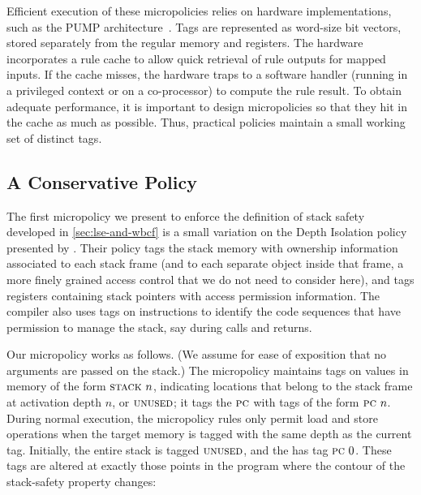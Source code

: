 \documentclass[acmsmall,review,anonymous]{acmart}\settopmatter{printfolios=true,printccs=false,printacmref=false}
\begin{document}
{Efficient execution of these micropolicies relies on hardware implementations,
such as the PUMP architecture~\citep{pump:asplos2015}.  Tags are represented
as word-size bit vectors, stored separately from the regular memory and registers.
The hardware incorporates a rule cache
to allow quick retrieval of rule outputs for mapped inputs. If the cache misses,
the hardware traps to a software handler (running in a privileged context or
on a co-processor) to compute the rule result. To obtain adequate performance,
it is important to design micropolicies so that they hit in the cache as
much as possible. Thus, practical policies maintain a small working set of
distinct tags.

\subsection{A Conservative Policy}
\label{sec:conservative}
%
The first micropolicy we present to enforce the definition of stack
safety developed in \cref{sec:lse-and-wbcf} is a small variation
on the Depth Isolation policy presented by
\citet{DBLP:conf/sp/RoesslerD18}. Their policy tags the stack memory
with ownership information associated to each stack frame (and to each
separate object inside that frame, a more finely grained access
control that we do not need to consider here), and tags registers containing
stack pointers with access permission information. The compiler also
uses tags on instructions to identify the code
sequences that have permission to manage the stack, say during calls and returns.

Our micropolicy works as follows. (We assume for ease of exposition that no
arguments are passed on the stack.)
The micropolicy maintains tags on values in memory of the form $\textsc{stack} ~ n$,
indicating locations that belong to the stack frame at activation depth $n$,
or $\textsc{unused}$; it tags the $\textsc{pc}$ with tags of the form $\textsc{pc} ~ n$.
During normal execution, the micropolicy rules only permit load and store operations
when the target memory is tagged with the same depth as the current {\PCname} tag.
Initially, the entire stack is tagged $\textsc{unused}$,
and the {\PCname} has tag $\textsc{pc} ~ 0$. These tags are altered
at exactly those points in
the program where the contour of the stack-safety property changes:

}
\end{document}
